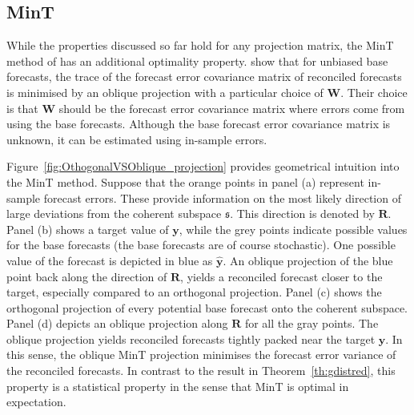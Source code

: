 \documentclass[12pt]{article}
\theoremstyle{definition}
\begin{document}
	
	\subsection{MinT}
	
	While the properties discussed so far hold for any projection matrix, the MinT method of \cite{WicEtAl2019} has an additional optimality property.  \cite{WicEtAl2019} show that for unbiased base forecasts, the trace of the forecast error covariance matrix of reconciled forecasts is minimised by an oblique projection with a particular choice of $\bm{W}$.  Their choice is that $\bm{W}$ should be the forecast error covariance matrix where errors come from using the base forecasts.  Although the base forecast error covariance matrix is unknown, it can be estimated using in-sample errors.
	
	
	Figure~\ref{fig:OthogonalVSOblique_projection} provides geometrical intuition into the MinT method.  Suppose that the orange points in panel (a) represent in-sample forecast errors.  These provide information on the most likely direction of large deviations from the coherent subspace $\mathfrak{s}$.  This direction is denoted by $\bm{R}$.  Panel (b) shows a target value of $\bm{y}$, while the grey points indicate possible values for the base forecasts (the base forecasts are of course stochastic).  One possible value of the forecast is depicted in blue as $\hat{\bm{y}}$.  An oblique projection of the blue point back along the direction of $\bm{R}$, yields a reconciled forecast closer to the target, especially compared to an orthogonal projection. Panel (c) shows the orthogonal projection of every potential base forecast onto the coherent subspace. Panel (d) depicts an oblique projection along $\bm{R}$ for all the gray points. The oblique projection yields reconciled forecasts tightly packed near the target $\bm{y}$.  In this sense, the oblique MinT projection minimises the forecast error variance of the reconciled forecasts. In contrast to the result in Theorem~\ref{th:gdistred}, this property is a statistical property in the sense that MinT is optimal in expectation.
	
\end{document}
